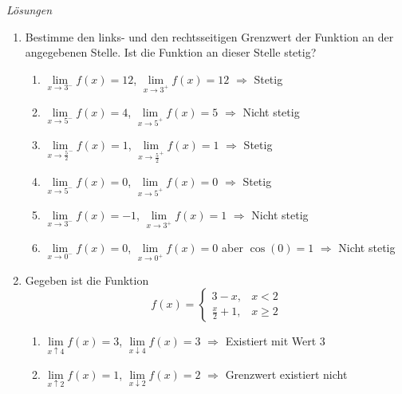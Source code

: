 \clearpage
\emph{Lösungen}
\begin{enumerate}
    \item Bestimme den links- und den rechtsseitigen Grenzwert der Funktion an der angegebenen Stelle. Ist die Funktion an dieser Stelle stetig?
    
    \begin{enumerate}
        \item $\lim\limits_{x \to 3^-} f(x) = 12$, \quad $\lim\limits_{x \to 3^+} f(x) = 12$ \newline $\Rightarrow$ Stetig
        \item $\lim\limits_{x \to 5^-} f(x) = 4$, \quad $\lim\limits_{x \to 5^+} f(x) = 5$ \newline $\Rightarrow$ Nicht stetig
        \item $\lim\limits_{x \to \frac{5}{2}^-} f(x) = 1$, \quad $\lim\limits_{x \to \frac{5}{2}^+} f(x) = 1$ \newline $\Rightarrow$  Stetig
        \item $\lim\limits_{x \to 5^-} f(x) = 0$, \quad $\lim\limits_{x \to 5^+} f(x) = 0$ \newline $\Rightarrow$ Stetig
        \item $\lim\limits_{x \to 3^-} f(x) = -1$, \quad $\lim\limits_{x \to 3^+} f(x) = 1$ \newline $\Rightarrow$ Nicht stetig
        \item $\lim\limits_{x \to 0^-} f(x) = 0$, \quad $\lim\limits_{x \to 0^+} f(x) = 0$ aber $\cos(0)=1$ \newline $\Rightarrow$ Nicht stetig
    \end{enumerate}
    
    \item Gegeben ist die Funktion 
    \[
        f(x) = \begin{cases} 
        3-x, & x<2 \\ 
        \frac{x}{2}+1, & x\geq 2 
        \end{cases}
    \]
    \begin{enumerate}
        \item $\lim\limits_{x \uparrow 4} f(x) = 3$, \quad $\lim\limits_{x \downarrow 4} f(x) = 3$ \newline $\Rightarrow$ Existiert mit Wert $3$
        \item $\lim\limits_{x \uparrow 2} f(x) = 1$, \quad $\lim\limits_{x \downarrow 2} f(x) = 2$ \newline $\Rightarrow$ Grenzwert existiert nicht
    \end{enumerate}
\end{enumerate}


